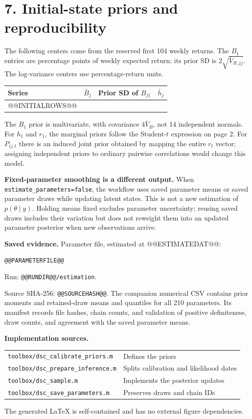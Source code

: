 \documentclass[10pt,a4paper]{article}
\begin{document}
\section*{7. Initial-state priors and reproducibility}
The following centers come from the reserved first 104 weekly returns.
The $B_1$ entries are percentage points of weekly expected return; its prior SD is
$2\sqrt{\bar V_{B,jj}}$. The log-variance centers use percentage-return units.
\begin{center}\small
\begin{tabular}{lrrr}\toprule
Series & $\bar B_j$ & Prior SD of $B_{j1}$ & $\bar h_j$\\\midrule
@@INITIALROWS@@
\bottomrule\end{tabular}\end{center}
The $B_1$ prior is multivariate, with covariance $4\bar V_B$, not 14 independent normals.
For $h_1$ and $r_1$, the marginal priors follow the Student-$t$ expression on page 2.
For $P_{ij,t}$ there is an induced joint prior obtained by mapping the entire $r_t$ vector;
assigning independent priors to ordinary pairwise correlations would change this model.

\textbf{Fixed-parameter smoothing is a different output.} When
\texttt{estimate\_parameters=false}, the workflow uses saved parameter means or saved
parameter draws while updating latent states. This is not a new estimation of
$p(\theta\mid y)$. Holding means fixed excludes parameter uncertainty; reusing saved
draws includes their variation but does not reweight them into an updated parameter
posterior when new observations arrive.

\textbf{Saved evidence.} Parameter file, estimated at @@ESTIMATEDAT@@:
\par{\footnotesize\nolinkurl{@@PARAMETERFILE@@}}
\par Run: {\footnotesize\nolinkurl{@@RUNDIR@@/estimation}}.
\par Source SHA-256: {\scriptsize\nolinkurl{@@SOURCEHASH@@}}.
The companion numerical CSV contains prior moments and retained-draw means and quantiles
for all 210 parameters. Its manifest records file hashes, chain counts, and validation
of positive definiteness, draw counts, and agreement with the saved parameter means.

\textbf{Implementation sources.}\par
{\footnotesize\begin{tabular}{@{}ll@{}}
\nolinkurl{toolbox/dsc_calibrate_priors.m} & Defines the priors\\
\nolinkurl{toolbox/dsc_prepare_inference.m} & Splits calibration and likelihood dates\\
\nolinkurl{toolbox/dsc_sample.m} & Implements the posterior updates\\
\nolinkurl{toolbox/dsc_save_parameters.m} & Preserves draws and chain IDs\\
\end{tabular}}
\par The generated LaTeX is self-contained and has no external figure dependencies.
\end{document}
